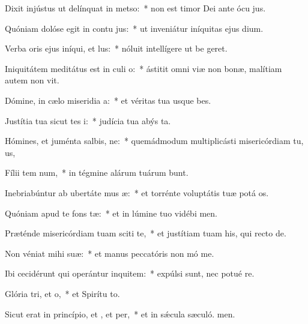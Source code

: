 \item Dixit injústus ut delínquat in metso:~* non est timor Dei ante ócu jus.
\item Quóniam dolóse egit in contu jus:~* ut inveniátur iníquitas ejus  dium.
\item Verba oris ejus iníqui, et lus:~* nóluit intellígere ut be geret.
\item Iniquitátem meditátus est in culi o:~* ástitit omni viæ non bonæ, malítiam autem non vit.
\item Dómine, in cælo miseridia a:~* et véritas tua usque  bes.
\item Justítia tua sicut tes i:~* judícia tua abýs ta.
\item Hómines, et juménta salbis, ne:~* quemádmodum multiplicásti misericórdiam tu, us,
\item Fílii tem num,~* in tégmine alárum tuárum bunt.
\item Inebriabúntur ab ubertáte mus æ:~* et torrénte voluptátis tuæ potá os.
\item Quóniam apud te  fons tæ:~* et in lúmine tuo vidébi men.
\item Præténde misericórdiam tuam sciti te,~* et justítiam tuam his, qui recto  de.
\item Non véniat mihi  suæ:~* et manus peccatóris non mó me.
\item Ibi cecidérunt qui operántur inquitem:~* expúlsi sunt, nec potué re.
\item Glória tri, et o,~* et Spirítu to.
\item Sicut erat in princípio, et , et per,~* et in sǽcula sæculó. men.
